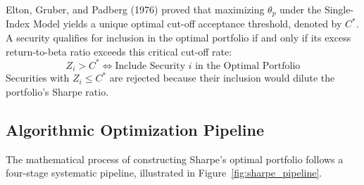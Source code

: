 Elton, Gruber, and Padberg (1976) proved that maximizing $\theta_p$ under the Single-Index Model yields a unique optimal cut-off acceptance threshold, denoted by $C^*$. A security qualifies for inclusion in the optimal portfolio if and only if its excess return-to-beta ratio exceeds this critical cut-off rate:
\begin{equation}
    Z_i > C^* \iff \text{Include Security } i \text{ in the Optimal Portfolio}
\end{equation}
Securities with $Z_i \le C^*$ are rejected because their inclusion would dilute the portfolio's Sharpe ratio.

\subsection{Algorithmic Optimization Pipeline}
The mathematical process of constructing Sharpe's optimal portfolio follows a four-stage systematic pipeline, illustrated in Figure~\ref{fig:sharpe_pipeline}.

